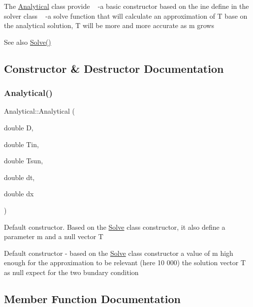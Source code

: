 The \hyperlink{class_analytical}{Analytical} class provide ~\newline
-\/a basic constructor based on the ine define in the solver class ~\newline
-\/a solve function that will calculate an approximation of T base on the analytical solution, T will be more and more accurate as m grows \begin{DoxySeeAlso}{See also}
\hyperlink{class_solve_a1e0efad6dcf6b09759dd38df7aa08db8}{Solve()} 
\end{DoxySeeAlso}


\subsection{Constructor \& Destructor Documentation}
\mbox{\label{class_analytical_a5a2be7809dfe198c5d6bdc5b6448f75b}} 
\subsubsection{\texorpdfstring{Analytical()}{Analytical()}}
{\footnotesize\ttfamily Analytical\+::\+Analytical (\begin{DoxyParamCaption}\item[{double}]{D,  }\item[{double}]{Tin,  }\item[{double}]{Tsun,  }\item[{double}]{dt,  }\item[{double}]{dx }\end{DoxyParamCaption})}

Default constructor. Based on the \hyperlink{class_solve}{Solve} class constructor, it also define a parameter m and a null vector T

Default constructor -\/  based on the \hyperlink{class_solve}{Solve} class constructor  a value of m high enough for the approximation to be relevant (here 10 000)  the solution vector T as null expect for the two bundary condition 

\subsection{Member Function Documentation}
\mbox{\label{class_analytical_a8fe1d5769bb516115a31719222eb9ae5}} 
